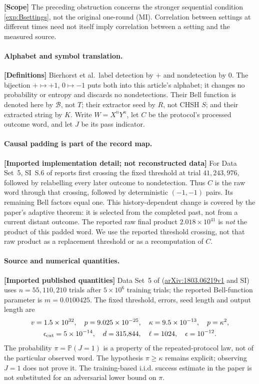 \documentclass[11pt,a4paper]{article}
\theoremstyle{definition}
\theoremstyle{remark}\newtheorem{remark}[theorem]{Remark}
\newcommand{\status}[1]{\textbf{[#1]}\quad}
\newcommand{\Prb}{\mathbb P}
\begin{document}
\status{Scope}
The preceding obstruction concerns the stronger sequential condition \eqref{exp:Bsettings}, not the original one-round (MI). Correlation between settings at different times need not itself imply correlation between a setting and the measured source.

\paragraph{Alphabet and symbol translation.}
\status{Definitions}
Bierhorst et al.\ label detection by $+$ and nondetection by $0$. The bijection $+\mapsto+1$, $0\mapsto-1$ puts both into this article's alphabet; it changes no probability or entropy and discards no nondetections. Their Bell function is denoted here by $\mathcal B$, not $T$; their extractor seed by $R$, not CHSH $S$; and their extracted string by $K$. Write $W=X^nY^n$, let $C$ be the protocol's processed outcome word, and let $J$ be its pass indicator.

\paragraph{Causal padding is part of the record map.}
\status{Imported implementation detail; not reconstructed data}
For Data Set~5, SI~S.6 of \cite{Bierhorst18} reports first crossing the fixed threshold at trial $41{,}243{,}976$, followed by relabelling every later outcome to nondetection. Thus $C$ is the raw word through that crossing, followed by deterministic $(-1,-1)$ pairs. Its remaining Bell factors equal one. This history-dependent change is covered by the paper's adaptive theorem: it is selected from the completed past, not from a current distant outcome. The reported raw final product $2.018\times10^{41}$ is \emph{not} the product of this padded word. We use the reported threshold crossing, not that raw product as a replacement threshold or as a recomputation of $C$.

\paragraph{Source and numerical quantities.}
\status{Imported published quantities}
Data Set~5 of \cite{Bierhorst18} (\href{https://arxiv.org/abs/1803.06219v1}{arXiv:1803.06219v1} and SI) uses $n=55{,}110{,}210$ trials after $5\times10^6$ training trials; the reported Bell-function parameter is $m=0.0100425$. The fixed threshold, errors, seed length and output length are
\begin{equation}\label{exp:parameters}
 \begin{gathered}
 v=1.5\times10^{32},\quad p=9.025\times10^{-25},\quad
 \kappa=9.5\times10^{-13},\quad p=\kappa^2,\\
 \epsilon_{\rm ext}=5\times10^{-14},\quad
 d=315{,}844,\quad \ell=1024,\quad \epsilon=10^{-12}.
 \end{gathered}
\end{equation}
The probability $\pi=\Prb(J=1)$ is a property of the repeated-protocol law, not of the particular observed word. The hypothesis $\pi\ge\kappa$ remains explicit; observing $J=1$ does not prove it. The training-based i.i.d. success estimate in the paper is not substituted for an adversarial lower bound on $\pi$.
\end{document}
